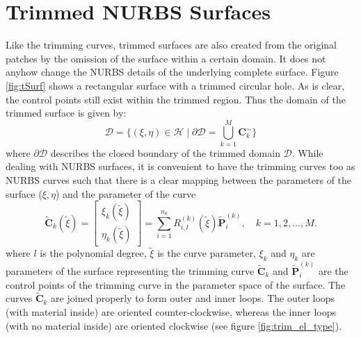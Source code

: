 \documentclass[12pt, a4paper]{report}
\begin{document}
\section{Trimmed NURBS Surfaces}
Like the trimming curves, trimmed surfaces are also created from the original patches by the omission of the surface within a certain domain. It does not anyhow change the NURBS details of the underlying complete surface. Figure \ref{fig:tSurf} shows a rectangular surface with a trimmed circular hole. As is clear, the control points still exist within the trimmed region.
Thus the domain of the trimmed surface is given by:
\begin{equation} 
\mathcal{D} = \{ (\xi, \eta) \in \mathcal{H} \mid \partial \mathcal{D} = \bigcup_{k=1}^{M} \mathbf{C}_k^{\sim} \}
\end{equation}
where $ \partial \mathcal{D}$ describes the closed boundary of the trimmed domain $\mathcal{D}$.
\newline
While dealing with NURBS surfaces, it is convenient to have the trimming curves too as NURBS curves such that there is a clear mapping between the parameters of the surface ($\xi, \eta$) and the parameter of the curve 
\begin{equation}
\mathbf{\tilde{C}}_{k}(\tilde{\xi}) = \begin{bmatrix} \xi_k(\tilde{\xi}) \\ \eta_k(\tilde{\xi}) \end{bmatrix} = \sum_{i=1}^{n_k} R_{i,l}^{(k)}(\tilde{\xi}) \mathbf{\tilde{P}}_{i}^{(k)}, \quad k = 1, 2, \ldots, M. \label{eq: trim_curve}
\end{equation}
where $l$ is the polynomial degree, $\tilde{\xi}$ is the curve parameter, $\xi_k$ and $\eta_k$ are
parameters of the surface representing the trimming curve $\mathbf{\tilde{C}}_{k}$ and $\mathbf{\tilde{P}}_{i}^{(k)}$ are
the control points of the trimming curve in the parameter space of the
surface. The curves $\mathbf{\tilde{C}}_{k}$ are joined properly to form outer and inner loops. The outer loops (with material inside) are oriented counter-clockwise, whereas the inner loops (with no material inside) are oriented clockwise (see figure \ref{fig:trim_el_type}).
\end{document}
